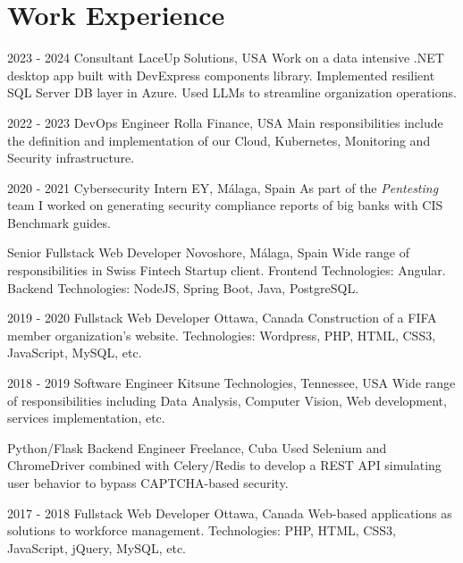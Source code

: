 \documentclass[]{friggeri-cv}
\begin{document}
\section{Work Experience}
\begin{entrylist}
  \entry
    {2023 - 2024}
    {Consultant}
    {LaceUp Solutions, USA}
    {Work on a data intensive .NET desktop app built with DevExpress components library. Implemented resilient SQL Server DB layer in Azure. Used LLMs to streamline organization operations.\\}

  \entry
    {2022 - 2023}
    {DevOps Engineer}
    {Rolla Finance, USA}
    {Main responsibilities include the definition and implementation of our Cloud, Kubernetes, Monitoring and Security infrastructure.\\}

  \entry
    {2020 - 2021}
    {Cybersecurity Intern}
    {EY, Málaga, Spain}
    {As part of the \emph{Pentesting} team I worked on generating security compliance reports of big banks with CIS Benchmark guides.\\}

  \entry
    {}
    {Senior Fullstack Web Developer}
    {Novoshore, Málaga, Spain}
    {Wide range of responsibilities in Swiss Fintech Startup client. Frontend Technologies: Angular. Backend Technologies: NodeJS, Spring Boot, Java, PostgreSQL.\\}

  \entry
    {2019 - 2020}
    {Fullstack Web Developer}
    {Ottawa, Canada} %
    {Construction of a FIFA member organization's website. Technologies: Wordpress, PHP, HTML, CSS3, JavaScript, MySQL, etc.\\} 

  \entry
    {2018 - 2019}
    {Software Engineer}
    {Kitsune Technologies, Tennessee, USA}
    {Wide range of responsibilities including Data Analysis, Computer Vision, Web development, services implementation, etc.\\}

  \entry
    {}
    {Python/Flask Backend Engineer}
    {Freelance, Cuba} %
    {Used Selenium and ChromeDriver combined with Celery/Redis to develop a REST API simulating user behavior to bypass CAPTCHA-based security.\\}  

  \entry
    {2017 - 2018}
    {Fullstack Web Developer}
    {Ottawa, Canada} %
    {Web-based applications as solutions to workforce management. Technologies: PHP, HTML, CSS3, JavaScript, jQuery, MySQL, etc.\\} 


\end{entrylist}
\end{document}
